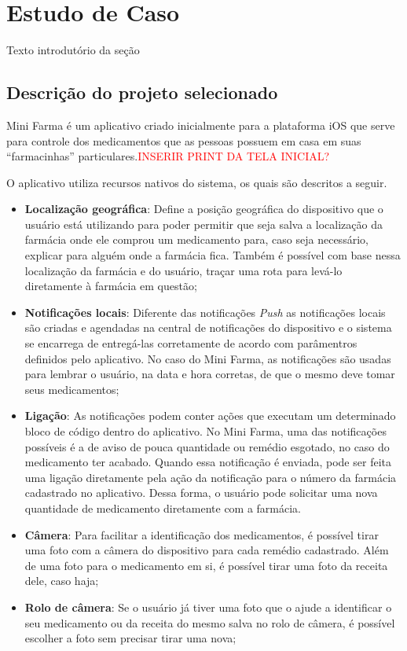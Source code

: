\chapter{Estudo de Caso} \label{estudodecaso}

Texto introdutório da seção

\section{Descrição do projeto selecionado} \label{subsec:descricaodoprojeto}

Mini Farma é um aplicativo criado inicialmente para a plataforma iOS que serve para controle dos medicamentos que as 
pessoas possuem em casa em suas ``farmacinhas'' particulares.\textcolor{red}{INSERIR PRINT DA TELA INICIAL?}


O aplicativo utiliza recursos nativos do sistema, os quais são descritos a seguir. 
\begin{itemize}
	\item \textbf{Localização geográfica}: Define a posição geográfica do dispositivo que o usuário está utilizando para poder permitir
    que seja salva a localização da farmácia onde ele comprou um medicamento para, caso seja necessário, explicar para alguém onde a 
    farmácia fica. Também é possível com base nessa localização da farmácia e do usuário, traçar uma rota para levá-lo diretamente à 
    farmácia em questão;
	\item \textbf{Notificações locais}: Diferente das notificações \textit{Push} as notificações locais são criadas e agendadas na central 
    de notificações do dispositivo e o sistema se encarrega de entregá-las corretamente de acordo com parâmentros definidos pelo aplicativo. 
    No caso do Mini Farma, as notificações são usadas para lembrar o usuário, na data e hora corretas, de que o mesmo deve tomar seus medicamentos;
	\item \textbf{Ligação}: As notificações podem conter ações que executam um determinado bloco de código dentro do aplicativo. No Mini Farma, 
    uma das notificações possíveis é a de aviso de pouca quantidade ou remédio esgotado, no caso do medicamento ter acabado. 
    Quando essa notificação é enviada, pode ser feita uma ligação diretamente pela ação da notificação para o número da 
    farmácia cadastrado no aplicativo. Dessa forma, o usuário pode solicitar uma nova quantidade de medicamento diretamente com a farmácia. 
	\item \textbf{Câmera}: Para facilitar a identificação dos medicamentos, é possível tirar uma foto com a câmera do dispositivo para 
    cada remédio cadastrado. Além de uma foto para o medicamento em si, é possível tirar uma foto da receita dele, caso haja;
    \item \textbf{Rolo de câmera}: Se o usuário já tiver uma foto que o ajude a identificar o seu medicamento ou da receita do mesmo salva 
    no rolo de câmera, é possível escolher a foto sem precisar tirar uma nova;
\end{itemize}


